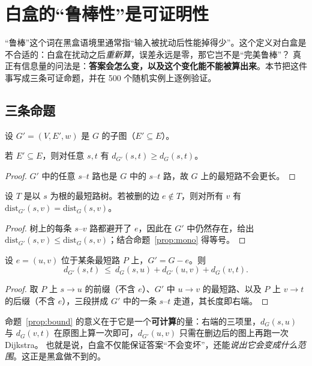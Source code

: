 \section{白盒的“鲁棒性”是可证明性}\label{sec:robust}

“鲁棒”这个词在黑盒语境里通常指“输入被扰动后性能掉得少”。这个定义对白盒是不合适的：白盒在扰动之后\emph{重新算}，误差永远是零，那它岂不是“完美鲁棒”？
真正有信息量的问法是：\textbf{答案会怎么变，以及这个变化能不能被算出来}。本节把这件事写成三条可证命题，并在 500 个随机实例上逐例验证。

\subsection{三条命题}

设 $G'=(V,E',w)$ 是 $G$ 的子图（$E'\subseteq E$）。

\begin{proposition}[删边单调性]\label{prop:mono}
若 $E'\subseteq E$，则对任意 $s,t$ 有 $d_{G'}(s,t)\ge d_G(s,t)$。
\end{proposition}
\begin{proof}
$G'$ 中的任意 $s$--$t$ 路也是 $G$ 中的 $s$--$t$ 路，故 $G$ 上的最短路不会更长。
\end{proof}

\begin{proposition}[非树边不变性]\label{prop:nontree}
设 $T$ 是以 $s$ 为根的最短路树。若被删的边 $e\notin T$，则对所有 $v$ 有 $\mathrm{dist}_{G'}(s,v)=\mathrm{dist}_G(s,v)$。
\end{proposition}
\begin{proof}
树上的每条 $s$--$v$ 路都避开了 $e$，因此在 $G'$ 中仍然存在，给出 $\mathrm{dist}_{G'}(s,v)\le \mathrm{dist}_G(s,v)$；结合命题~\ref{prop:mono} 得等号。
\end{proof}

\begin{proposition}[单边删除的可计算上界]\label{prop:bound}
设 $e=(u,v)$ 位于某条最短路 $P$ 上，$G'=G-e$。则
\begin{equation}
d_{G'}(s,t)\ \le\ d_G(s,u)+d_{G'}(u,v)+d_G(v,t).
\label{eq:bound}
\end{equation}
\end{proposition}
\begin{proof}
取 $P$ 上 $s\to u$ 的前缀（不含 $e$）、$G'$ 中 $u\to v$ 的最短路、以及 $P$ 上 $v\to t$ 的后缀（不含 $e$），三段拼成 $G'$ 中的一条 $s$--$t$ 走道，其长度即右端。
\end{proof}

命题~\ref{prop:bound} 的意义在于它是一个\textbf{可计算}的量：右端的三项里，$d_G(s,u)$ 与 $d_G(v,t)$ 在原图上算一次即可，$d_{G'}(u,v)$ 只需在删边后的图上再跑一次 Dijkstra。
也就是说，白盒不仅能保证答案“不会变坏”，还能\emph{说出它会变成什么范围}。这正是黑盒做不到的。

